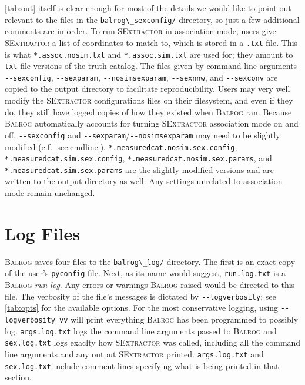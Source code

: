\documentclass[11pt]{book}
\newcommand{\codett}[1]{\lstinline{#1}}
\newcommand{\pyconfig}{\codett{pyconfig}}
\newcommand{\balrog}{\textsc{Balrog}}
\newcommand{\sex}{\textsc{SExtractor}}
\newcommand{\opt}[1]{\codett{--#1}}
\begin{document}
\autoref{tab:out} itself is clear enough for most of the details we would like to point out relevant to
the files in the \codett{balrog\_sexconfig/} directory, so just a few additional comments are in order.
To run \sex{} in association mode, users give \sex{} a list of coordinates to match to, which is stored in a \codett{.txt} file.
This is what \codett{*.assoc.nosim.txt} and \codett{*.assoc.sim.txt} are used for;
they amount to \codett{txt} file versions of the truth catalog.
The files given by command line arguments \opt{sexconfig}, \opt{sexparam}, \opt{nosimsexparam}, \opt{sexnnw}, and \opt{sexconv}
are copied to the output directory to facilitate reproducibility. Users may very well modify 
the \sex{} configurations files on their filesystem, and even if they do, they still have logged copies of how they existed when \balrog{} ran.
Because \balrog{} automatically accounts for turning \sex{} association mode on and off, 
\opt{sexconfig} and \opt{sexparam}/\opt{nosimsexparam} may need to be slightly modified
(c.f. \autoref{sec:cmdline}).
\codett{*.measuredcat.nosim.sex.config}, \codett{*.measuredcat.sim.sex.config}, \codett{*.measuredcat.nosim.sex.params}, 
and \codett{*.measuredcat.sim.sex.params} 
are the slightly modified versions and are written to the output directory as well.
Any settings unrelated to association mode remain unchanged.


\section{Log Files}
\label{sec:logs}

\balrog{} saves four files to the \codett{balrog\_log/} directory.
The first is an exact copy of the user's \pyconfig{} file.
Next, as its name would suggest, \codett{run.log.txt} is a \balrog{} \emph{run log}.
Any errors or warnings \balrog{} raised would be directed to this file.
The verbosity of the file's messages is dictated by \opt{logverbosity}; see \autoref{tab:opts}
for the available options. For the most conservative logging, 
using \opt{logverbosity vv} will print everything \balrog{} has been programmed 
to possibly log.
\codett{args.log.txt} logs the command line arguments passed to \balrog{}
and \codett{sex.log.txt} logs exaclty how \sex{} was called, including all the command line arguments and any output \sex{} printed.
\codett{args.log.txt} and \codett{sex.log.txt} include comment lines specifying 
what is being printed in that section.
\end{document}
